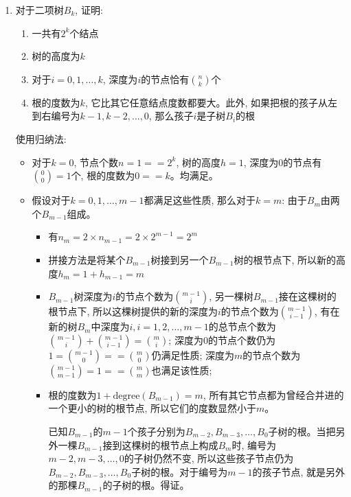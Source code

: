 \documentclass[paper=a4, fontsize=11pt]{scrartcl} %
\numberwithin{equation}{section} %
\numberwithin{figure}{section} %
\numberwithin{table}{section} %
\begin{document}
  \begin{enumerate}[a]
  \item 对于二项树$B_k$, 证明:
    \begin{enumerate}[1]
    \item 一共有$2^k$个结点
    \item 树的高度为$k$
    \item 对于$i=0, 1, \dots, k$, 深度为$i$的节点恰有$\binom{n}{k}$个
    \item 根的度数为$k$, 它比其它任意结点度数都要大。此外, 如果把根的孩子从左到右编号为$k-1, k-2, \dots, 0$, 那么孩子$i$是子树$B_i$的根
    \end{enumerate}

    \begin{addmargin}[3em]{0em}
    使用归纳法:
    \begin{itemize}
    \item 对于$k=0$, 节点个数$n = 1 == 2^k$, 树的高度$h = 1$, 深度为$0$的节点有$\binom{0}{0} = 1$个, 根的度数为$0 == k$。均满足。
    \item 假设对于$k = 0, 1, \dots, m-1$都满足这些性质, 那么对于$k = m$: 由于$B_m$由两个$B_{m-1}$组成。
      \begin{itemize}
      \item 有$n_m = 2 \times n_{m-1} = 2 \times 2^{m-1} = 2^m$
      \item 拼接方法是将某个$B_{m-1}$树接到另一个$B_{m-1}$树的根节点下, 所以新的高度$h_m = 1 + h_{m-1} = m$
      \item $B_{m-1}$树深度为$i$的节点个数为$\binom{m-1}{i}$, 另一棵树$B_{m-1}$接在这棵树的根节点下, 所以这棵树提供的新的深度为$i$的节点个数为$\binom{m-1}{i-1}$,
        有在新的树$B_m$中深度为$i, i=1,2,\dots,m-1$的总节点个数为$\binom{m-1}{i} + \binom{m-1}{i-1} = \binom{m}{i}$;
        深度为0的节点个数仍为$1 = \binom{m-1}{0} == \binom{m}{0}$仍满足性质; 深度为$m$的节点个数为$\binom{m-1}{m-1} = 1 == \binom{m}{m}$也满足该性质;
      \item 根的度数为$1 + \mbox{degree}(B_{m-1}) = m$, 所有其它节点都为曾经合并进的一个更小的树的根节点, 所以它们的度数显然小于$m$。

        已知$B_{m-1}$的$m-1$个孩子分别为$B_{m-2}, B_{m-3}, \dots, B_0$子树的根。当把另外一棵$B_{m-1}$接到这棵树的根节点上构成$B_m$时, 编号为$m-2, m-3, \dots, 0$的子树仍然不变, 所以这些孩子节点仍为$B_{m-2}, B_{m-3}, \dots, B_0$子树的根。对于编号为$m-1$的孩子节点, 就是另外的那棵$B_{m-1}$的子树的根。得证。
      \end{itemize}
    \end{itemize}
    \end{addmargin}


\end{enumerate}
\end{document}
